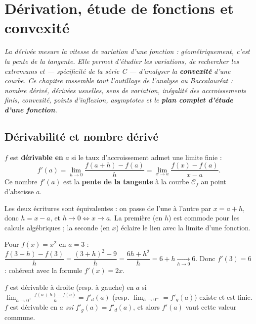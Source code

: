 \chapter{Dérivation, étude de fonctions et convexité}

\noindent\textit{La dérivée mesure la vitesse de variation d'une fonction : géométriquement,
c'est la pente de la tangente. Elle permet d'étudier les variations, de rechercher les
extremums et — spécificité de la série C — d'analyser la \textbf{convexité} d'une courbe.
Ce chapitre rassemble tout l'outillage de l'analyse au Baccalauréat : nombre dérivé,
dérivées usuelles, sens de variation, inégalité des accroissements finis, convexité,
points d'inflexion, asymptotes et le \textbf{plan complet d'étude d'une fonction}.}
\vspace{8pt}

\section{Dérivabilité et nombre dérivé}

\begin{definition}
$f$ est \textbf{dérivable en} $a$ si le taux d'accroissement admet une limite finie :
\[
f'(a)=\lim_{h\to0}\frac{f(a+h)-f(a)}{h}=\lim_{x\to a}\frac{f(x)-f(a)}{x-a}.
\]
Ce nombre $f'(a)$ est la \textbf{pente de la tangente} à la courbe $\mathcal C_f$ au point d'abscisse $a$.
\end{definition}

\begin{remarque}
Les deux écritures sont équivalentes : on passe de l'une à l'autre par $x=a+h$, donc $h=x-a$,
et $h\to0\iff x\to a$. La première (en $h$) est commode pour les calculs algébriques ; la
seconde (en $x$) éclaire le lien avec la limite d'une fonction.
\end{remarque}

\begin{exemple}
Pour $f(x)=x^{2}$ en $a=3$ :
$\dfrac{f(3+h)-f(3)}{h}=\dfrac{(3+h)^{2}-9}{h}=\dfrac{6h+h^{2}}{h}=6+h\xrightarrow[h\to0]{}6$.
Donc $f'(3)=6$ : cohérent avec la formule $f'(x)=2x$.
\end{exemple}

\begin{definition}
$f$ est dérivable à droite (resp. à gauche) en $a$ si $\displaystyle\lim_{h\to0^{+}}\frac{f(a+h)-f(a)}{h}=f'_d(a)$
(resp. $\lim_{h\to0^{-}}=f'_g(a)$) existe et est finie. $f$ est dérivable en $a$ \emph{ssi}
$f'_g(a)=f'_d(a)$, et alors $f'(a)$ vaut cette valeur commune.
\end{definition}

